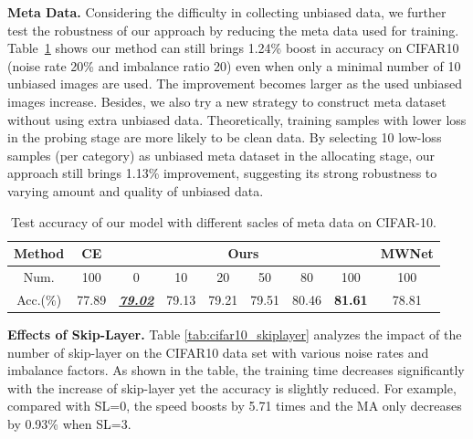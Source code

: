 \documentclass[letterpaper]{article} %
\newcommand{\bd}[1]{\textbf{#1}}
\begin{document}
\noindent\bd{Meta Data.} 
Considering the difficulty in collecting unbiased data, we further test the robustness of our approach by reducing the meta data used for training.
Table~\ref{tab:cifar10_size} shows our method can still brings 1.24\% boost in accuracy on CIFAR10 (noise rate 20\% and imbalance ratio 20) even when only a  minimal number of 10 unbiased images are used. The improvement becomes larger as the used unbiased images increase.
Besides, we also try a new strategy to construct meta dataset without using extra unbiased data.
Theoretically, training samples with lower loss in the probing stage are more likely to be clean data. 
By selecting 10 low-loss samples (per category) as unbiased meta dataset in the allocating stage, 
our approach still brings 1.13\% improvement,
suggesting its strong robustness to varying amount and quality of unbiased data. 

\begin{table}[h!]
\vspace{-0.3cm}
\begin{center}
\begin{adjustbox}{max width=0.47\textwidth}
    \begin{tabular}{c|c|c|c|c|c|c|c|c}
    \toprule
    Method  & CE     & \multicolumn{6}{c|}{Ours} & MWNet\\
    \hline
    Num.  & 100  & 0   & 10    & 20    & 50    & 80    & 100 & 100\\
    \hline
    Acc.(\%)  & 77.89 & \bd{\underline{\textit{79.02}}} & 79.13     & 79.21 & 79.51 & 80.46 & \bd{81.61} & 78.81\\
    \bottomrule
    \end{tabular}%
\end{adjustbox}
\vspace{-0.3cm}
\caption{
Test accuracy of our model with different sacles of meta data on CIFAR-10.
}
\label{tab:cifar10_size}
\vspace{-0.4cm}
\end{center}
\end{table}

\noindent\bd{Effects of Skip-Layer.} Table \ref{tab:cifar10_skiplayer} analyzes the impact of the number of skip-layer on the CIFAR10 data set with various noise rates and imbalance factors. 
As shown in the table, the training time decreases significantly with the increase of skip-layer yet the accuracy is slightly reduced.
For example, compared with SL=0, the speed boosts by 5.71 times and the MA only decreases by 0.93\% when SL=3.
\end{document}
